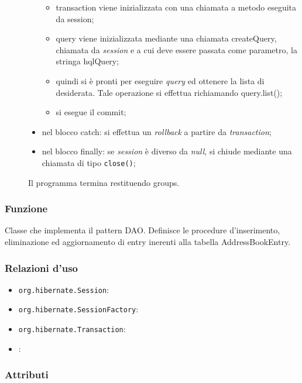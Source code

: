 \begin{description}
\begin{itemize}
\begin{itemize}
			\item transaction viene inizializzata con una chiamata a metodo  eseguita da session;
			\item query viene inizializzata mediante una chiamata createQuery, chiamata da \textit{session} e a cui deve essere passata come parametro, la stringa hqlQuery;
			\item quindi si è pronti per eseguire \textit{query} ed ottenere la lista di  desiderata. Tale operazione si effettua richiamando query.list();
			\item si esegue il commit;
		\end{itemize}
		\item nel blocco catch: si effettua un \textit{rollback} a partire da \textit{transaction};
		\item nel blocco finally: se \textit{session} è diverso da \textit{null}, si chiude mediante una chiamata di tipo \texttt{close()};
	\end{itemize}
	Il programma termina restituendo groups.
	
\end{description}



\subsubsection*{Funzione}
Classe che implementa il pattern DAO. Definisce le procedure d'inserimento, eliminazione ed aggiornamento di entry inerenti alla tabella AddressBookEntry.

\subsubsection*{Relazioni d'uso}

\begin{itemize}
	\item \texttt{org.hibernate.Session}:
	\item \texttt{org.hibernate.SessionFactory}:
	\item \texttt{org.hibernate.Transaction}:
	\item {}:
\end{itemize}

\subsubsection*{Attributi}

